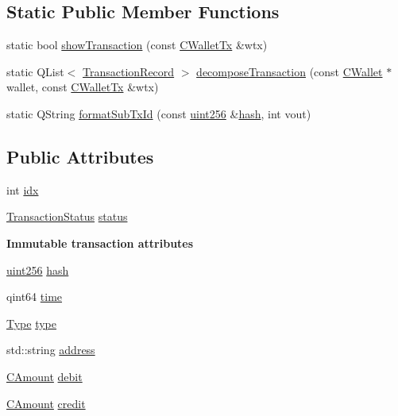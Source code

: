 \subsection*{Static Public Member Functions}
\begin{DoxyCompactItemize}
\item 
static bool \hyperlink{class_transaction_record_a5ad1d1af4bec5b15a624b7a451e8cdbf}{show\+Transaction} (const \hyperlink{class_c_wallet_tx}{C\+Wallet\+Tx} \&wtx)
\item 
static Q\+List$<$ \hyperlink{class_transaction_record}{Transaction\+Record} $>$ \hyperlink{class_transaction_record_a9f5db4465fa5fdcc3f9af525096bcdb9}{decompose\+Transaction} (const \hyperlink{class_c_wallet}{C\+Wallet} $\ast$wallet, const \hyperlink{class_c_wallet_tx}{C\+Wallet\+Tx} \&wtx)
\item 
static Q\+String \hyperlink{class_transaction_record_a7664c0127a66cdc42d3d56d6a85a5f1e}{format\+Sub\+Tx\+Id} (const \hyperlink{classuint256}{uint256} \&\hyperlink{class_transaction_record_a7a89b1316eb6e7c14be17cb8448ae586}{hash}, int vout)
\end{DoxyCompactItemize}
\subsection*{Public Attributes}
\begin{DoxyCompactItemize}
\item 
int \hyperlink{class_transaction_record_a143da419e3dc0bc2ec73e22b3a56d1c9}{idx}
\item 
\hyperlink{class_transaction_status}{Transaction\+Status} \hyperlink{class_transaction_record_a50342213092284a9994f2903991134c0}{status}
\end{DoxyCompactItemize}
\begin{Indent}{\bf Immutable transaction attributes}\par
\begin{DoxyCompactItemize}
\item 
\hyperlink{classuint256}{uint256} \hyperlink{class_transaction_record_a7a89b1316eb6e7c14be17cb8448ae586}{hash}
\item 
qint64 \hyperlink{class_transaction_record_afd105941a1ce3788f86573d17e999a8e}{time}
\item 
\hyperlink{class_transaction_record_afb76f5876fba21c3d2c388b98a35d685}{Type} \hyperlink{class_transaction_record_a6a68c861c3f1f10971fa11d8fc7c46e1}{type}
\item 
std\+::string \hyperlink{class_transaction_record_ad8d3d2765f95a40afc6cd93d4a881a38}{address}
\item 
\hyperlink{amount_8h_a4eaf3a5239714d8c45b851527f7cb564}{C\+Amount} \hyperlink{class_transaction_record_a536fdaa56c7f7fb789f064cc475d30c1}{debit}
\item 
\hyperlink{amount_8h_a4eaf3a5239714d8c45b851527f7cb564}{C\+Amount} \hyperlink{class_transaction_record_aea9d8e5ead391ada02422cef6f45d9c7}{credit}
\end{DoxyCompactItemize}
\end{Indent}
